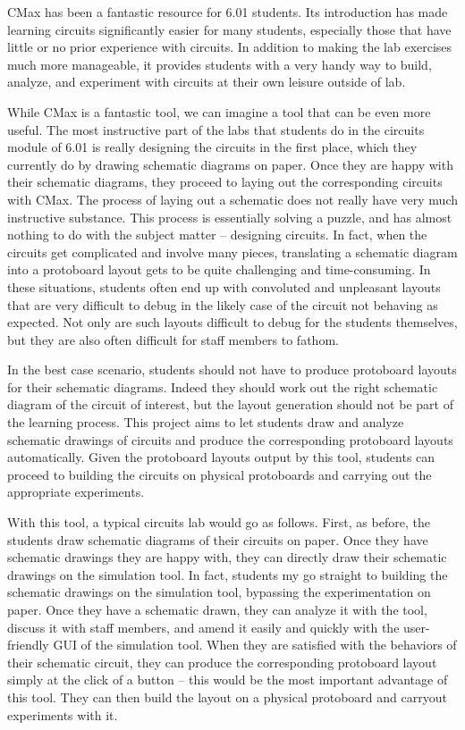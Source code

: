 CMax has been a fantastic resource for 6.01 students. Its introduction has made
learning circuits significantly easier for many students, especially those that
have little or no prior experience with circuits. In addition to making the lab
exercises much more manageable, it provides students with a very handy way to
build, analyze, and experiment with circuits at their own leisure outside of lab.

While CMax is a fantastic tool, we can imagine a tool that can be even more
useful. The most instructive part of the labs that students do in the circuits
module of 6.01 is really designing the circuits in the first place, which they
currently do by drawing schematic diagrams on paper. Once they are happy with
their schematic diagrams, they proceed to laying out the corresponding circuits
with CMax. The process of laying out a schematic does not really have very much
instructive substance. This process is essentially solving a puzzle, and has
almost nothing to do with the subject matter -- designing circuits. In fact,
when the circuits get complicated and involve many pieces, translating a
schematic diagram into a protoboard layout gets to be quite challenging and
time-consuming. In these situations, students often end up with convoluted and
unpleasant layouts that are very difficult to debug in the likely case of the
circuit not behaving as expected. Not only are such layouts difficult to debug
for the students themselves, but they are also often difficult for staff
members to fathom.

In the best case scenario, students should not have to produce protoboard
layouts for their schematic diagrams. Indeed they should work out the right
schematic diagram of the circuit of interest, but the layout generation should
not be part of the learning process. This project aims to let students draw and
analyze schematic drawings of circuits and produce the corresponding protoboard
layouts automatically. Given the protoboard layouts output by this tool,
students can proceed to building the circuits on physical protoboards and
carrying out the appropriate experiments.

With this tool, a typical circuits lab would go as follows. First, as before,
the students draw schematic diagrams of their circuits on paper. Once they have
schematic drawings they are happy with, they can directly draw their schematic
drawings on the simulation tool. In fact, students my go straight to building
the schematic drawings on the simulation tool, bypassing the experimentation on
paper. Once they have a schematic drawn, they can analyze it with the tool,
discuss it with staff members, and amend it easily and quickly with the
user-friendly GUI of the simulation tool. When they are
satisfied with the behaviors of their schematic circuit, they can produce the
corresponding protoboard layout simply at the click of a button -- this would be
the most important advantage of this tool. They can then build the layout on a
physical protoboard and carryout experiments with it.

